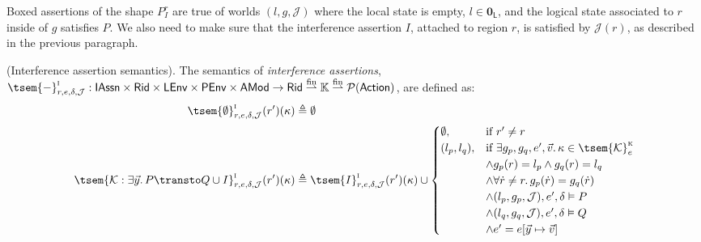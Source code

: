Boxed assertions of the shape $\boxed{P}^r_I$ are true of worlds $(l, g, \mathcal{J})$ where the local state is empty, $l \in \mathbf{0}_\mathsf{L}$, and the logical state associated to $r$ inside of $g$ satisfies $P$. We also need to make sure that the interference assertion $I$, attached to region $r$, is satisfied by $\mathcal{J}(r)$, as described in the previous paragraph.

\begin{defn}
	\label{defn:interferenceSem}
	(Interference assertion semantics).
	The semantics of \emph{interference assertions}, $\tsem{-}^\textsc{i}_{r, e, \delta, \mathcal{J}} : \mathsf{IAssn} \times \mathsf{Rid} \times \mathsf{LEnv} \times \mathsf{PEnv} \times \mathsf{AMod} \rightarrow \mathsf{Rid} \overset{\text{fin}}{\rightharpoonup} \mathbb{K} \overset{\text{fin}}{\rightharpoonup} \mathcal{P}(\mathsf{Action})$, are defined as:
	\begin{align*}
		\tsem{\emptyset}^\textsc{i}_{r, e, \delta, \mathcal{J}}(r')(\kappa) &\triangleq \emptyset
		\\
		\tsem{\mathcal{K}: \exists \vec{y} \ldotp P \transto Q \cup I}^\textsc{i}_{r, e, \delta, \mathcal{J}}(r')(\kappa) &\triangleq
			\tsem{I}^\textsc{i}_{r, e, \delta, \mathcal{J}}(r')(\kappa)
			\cup 
			\begin{cases}
				\emptyset, & \text{if } r' \neq r
				\\
				(l_p, l_q), & \text{if } \exists g_p, g_q, e', \vec{v} \ldotp
				\kappa \in \tsem{\mathcal{K}}^\textsc{k}_e
				\\
				& \land g_p(r) = l_p \land g_q(r) = l_q
				\\
				& \land \forall \dot{r} \neq r \ldotp g_p(\dot{r}) = g_q(\dot{r})
				\\
				& \land (l_p, g_p, \mathcal{J}), e', \delta \vDash P
				\\
				& \land (l_q, g_q, \mathcal{J}), e', \delta \vDash Q
				\\
				& \land e' = e[\vec{y} \mapsto \vec{v}] 
			\end{cases}
	\end{align*}
\end{defn}

